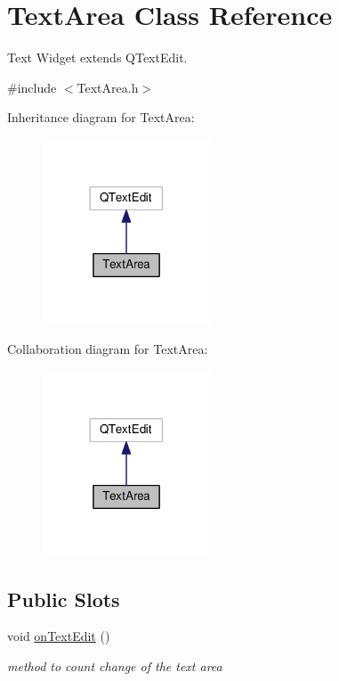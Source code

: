 \hypertarget{classTextArea}{\section{Text\+Area Class Reference}
\label{classTextArea}
}


Text Widget extends Q\+Text\+Edit.  




{\ttfamily \#include $<$Text\+Area.\+h$>$}



Inheritance diagram for Text\+Area\+:\nopagebreak
\begin{figure}[H]
\begin{center}
\leavevmode
\includegraphics[width=141pt]{classTextArea__inherit__graph}
\end{center}
\end{figure}


Collaboration diagram for Text\+Area\+:\nopagebreak
\begin{figure}[H]
\begin{center}
\leavevmode
\includegraphics[width=141pt]{classTextArea__coll__graph}
\end{center}
\end{figure}
\subsection*{Public Slots}
\begin{DoxyCompactItemize}
\item 
\hypertarget{classTextArea_ade48fb1e414e87363d0c14b6c1ec23de}{void \hyperlink{classTextArea_ade48fb1e414e87363d0c14b6c1ec23de}{on\+Text\+Edit} ()}\label{classTextArea_ade48fb1e414e87363d0c14b6c1ec23de}

\begin{DoxyCompactList}\small\item\em method to count change of the text area \end{DoxyCompactList}\end{DoxyCompactItemize}

